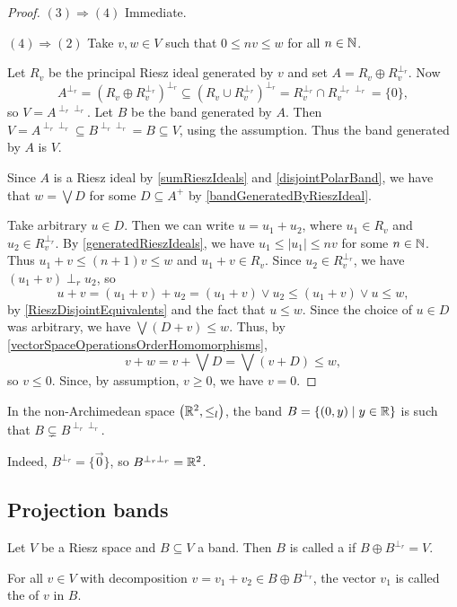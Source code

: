 \begin{proof}
$(3) \Rightarrow (4)$ Immediate.

$(4) \Rightarrow (2)$ Take $v,w\in V$ such that $0\leq nv\leq w$ for all $n\in \mathbb{N}$.

Let $R_v$ be the principal Riesz ideal generated by $v$ and set $A = R_v \oplus R_v^{\perp_r}$. Now
\[ A^{\perp_r} = (R_v \oplus R_v^{\perp_r})^{\perp_r} \subseteq (R_v \cup R_v^{\perp_r})^{\perp_r} = R_v^{\perp_r} \cap R_v^{\perp_r\perp_r} = \{0\}, \]
so $V = A^{\perp_r\perp_r}$. Let $B$ be the band generated by $A$. Then $V = A^{\perp_r\perp_r} \subseteq B^{\perp_r\perp_r} = B \subseteq V$, using the assumption. Thus the band generated by $A$ is $V$. 

Since $A$ is a Riesz ideal by \ref{sumRieszIdeals} and \ref{disjointPolarBand}, we have that $w = \bigvee D$ for some $D\subseteq A^+$ by \ref{bandGeneratedByRieszIdeal}.

Take arbitrary $u\in D$. Then we can write $u = u_1 + u_2$, where $u_1\in R_v$ and $u_2\in R_v^{\perp_r}$. By \ref{generatedRieszIdeals}, we have $u_1 \leq |u_1| \leq nv$ for some $n\in \mathbb{N}$. Thus $u_1 + v \leq (n+1)v \leq w$ and $u_1+v\in R_v$. Since $u_2\in R_v^{\perp_r}$, we have $(u_1+v)\perp_r u_2$, so
\[ u+v = (u_1+v)+u_2 = (u_1+v)\vee u_2 \leq (u_1+v)\vee u \leq w, \]
by \ref{RieszDisjointEquivalents} and the fact that $u\leq w$. Since the choice of $u\in D$ was arbitrary, we have $\bigvee (D+v) \leq w$. Thus, by \ref{vectorSpaceOperationsOrderHomomorphisms},
\[ v+w = v+\bigvee D = \bigvee(v+D) \leq w, \]
so $v\leq 0$. Since, by assumption, $v\geq 0$, we have $v = 0$.
\end{proof}

\begin{example}
In the non-Archimedean space $\sSet{\R^2, \leq_l}$, the band $B = \setbuilder{(0,y)}{y\in \R}$ is such that $B \subsetneq B^{\perp_r\perp_r}$.

Indeed, $B^{\perp_r} = \{\vec{0}\}$, so $B^{\perp_r\perp_r} = \mathbb{R}^2$.
\end{example}

\subsection{Projection bands}
\begin{definition}
Let $V$ be a Riesz space and $B\subseteq V$ a band. Then $B$ is called a  if $B\oplus B^{\perp_r} = V$.

For all $v\in V$ with decomposition $v= v_1 +v_2 \in B\oplus B^{\perp_r}$, the vector $v_1$ is called the  of $v$ in $B$.
\end{definition}

